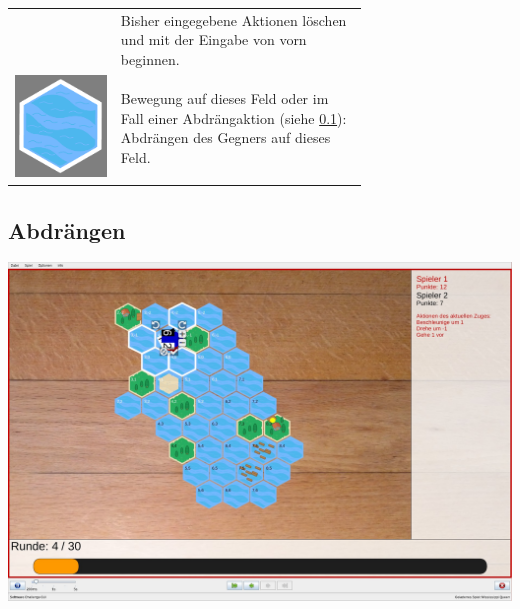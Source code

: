\documentclass[12pt,a4paper, ngerman, oneside]{scrartcl}
\begin{document}
\begin{table}[h!]
\begin{tabular}{ c m{0.7\linewidth} }
\begin{minipage}{1cm}
    \end{minipage}
    &
    Bisher eingegebene Aktionen löschen und mit der Eingabe von vorn beginnen.
    \\
    \begin{minipage}{1cm}
      \includegraphics[width=\linewidth]{bilder/water-marked}
    \end{minipage}
    &
    Bewegung auf dieses Feld oder im Fall einer Abdrängaktion (siehe \ref{sec:push}): Abdrängen des Gegners auf dieses Feld.
  \end{tabular}
\end{table}

\subsection{Abdrängen}\label{sec:push}

\begin{centering}
  \includegraphics[width=\textwidth]{bilder/spielfeld-abdraengen.jpg}
\end{centering}
\end{document}
